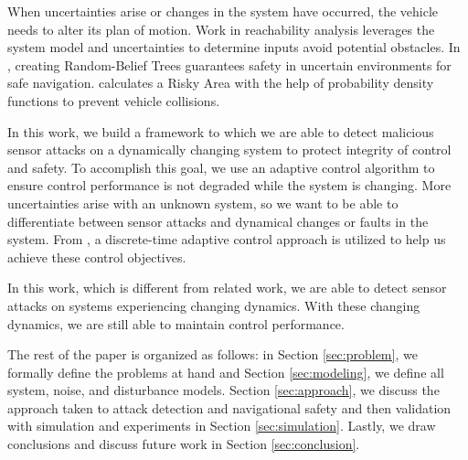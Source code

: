 When uncertainties arise or changes in the system have occurred, the vehicle needs to alter its plan of motion. Work in reachability analysis \cite{8046382,7799325,5980268} leverages the system model and uncertainties to determine inputs avoid potential obstacles. In \cite{5980508}, creating Random-Belief Trees guarantees safety in uncertain environments for safe navigation. \cite{6934041} calculates a Risky Area with the help of probability density functions to prevent vehicle collisions.


In this work, we build a framework to which we are able to detect malicious sensor attacks on a dynamically changing system to protect integrity of control and safety. To accomplish this goal, we use an adaptive control algorithm to ensure control performance is not degraded while the system is changing. More uncertainties arise with an unknown system, so we want to be able to differentiate between sensor attacks and dynamical changes or faults in the system. From \cite{tao2003adaptive,Goodwin1643720}, a  discrete-time adaptive control approach is utilized to help us achieve these control objectives.

In this work, which is different from related work, we are able to detect sensor attacks on systems experiencing changing dynamics. With these changing dynamics, we are still able to maintain control performance.

The rest of the paper is organized as follows: in Section \ref{sec:problem}, we formally define the problems at hand and Section \ref{sec:modeling}, we define all system, noise, and disturbance models. Section \ref{sec:approach}, we discuss the approach taken to attack detection and navigational safety and then validation with simulation and experiments in Section \ref{sec:simulation}. Lastly, we draw conclusions and discuss future work in Section \ref{sec:conclusion}.

